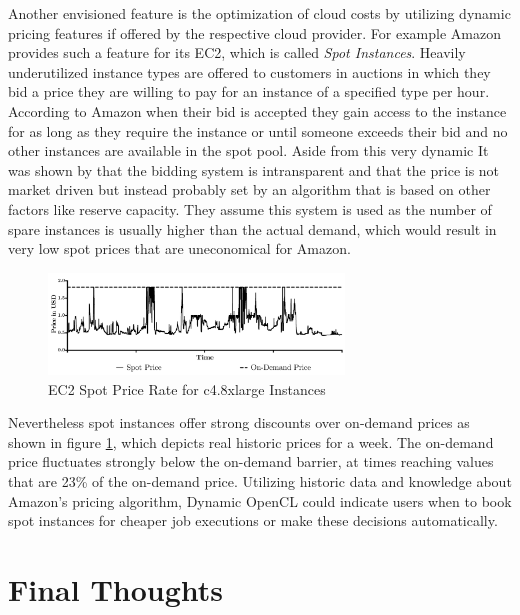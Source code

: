 Another envisioned feature is the optimization of cloud costs by utilizing dynamic pricing features if offered by the respective cloud provider. For example Amazon provides such a feature for its EC2, which is called \textit{Spot Instances}. Heavily underutilized instance types are offered to customers in auctions in which they bid a price they are willing to pay for an instance of a specified type per hour. According to Amazon when their bid is accepted they gain access to the instance for as long as they require the instance or until someone exceeds their bid and no other instances are available in the spot pool\cite{spot_instances}. Aside from this very dynamic  It was shown by \citeauthor{spot_instance_pricing} that the bidding system is intransparent and that the price is not market driven but instead probably set by an algorithm that is based on other factors like reserve capacity\cite{spot_instance_pricing}. They assume this system is used as the number of spare instances is usually higher than the actual demand, which would result in very low spot prices that are uneconomical for Amazon. 
\begin{figure}[!htb]	
	\includegraphics[width=0.7\textwidth]{images/ec2_spot_prices.pdf}
	\centering
	\caption{EC2 Spot Price Rate for c4.8xlarge Instances}
	\label{img:spot_pricing}
\end{figure}
Nevertheless spot instances offer strong discounts over on-demand prices as shown in figure \ref{img:spot_pricing}, which depicts real historic prices for a week. The on-demand price fluctuates strongly below the on-demand barrier, at times reaching values that are 23\% of the on-demand price. Utilizing historic data and knowledge about Amazon's pricing algorithm, Dynamic OpenCL could indicate users when to book spot instances for cheaper job executions or make these decisions automatically.




\section{Final Thoughts}

